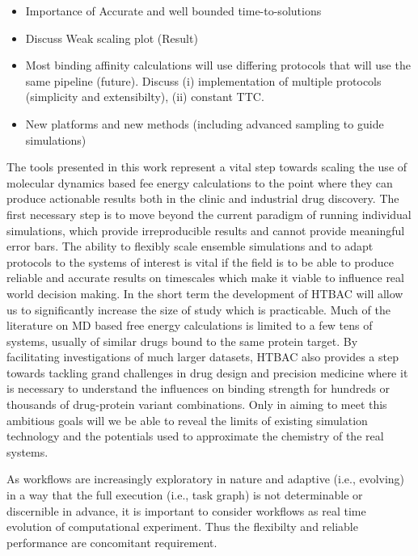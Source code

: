 
\begin{itemize}
	\item  Importance of Accurate and well bounded time-to-solutions 

	\item  Discuss Weak scaling plot (Result)

	\item  Most binding affinity calculations will use differing protocols that will use the same pipeline (future). Discuss (i) implementation of multiple protocols  (simplicity and extensibilty), (ii) constant TTC.

	\item  New platforms and new methods (including advanced sampling to guide simulations)

\end{itemize}


The tools presented in this work represent a vital step towards scaling the use of molecular
dynamics based fee energy calculations to the point where they can produce actionable 
results both in the clinic and industrial drug discovery.
The first necessary step is to move beyond the current paradigm of running individual simulations, 
which provide irreproducible results and cannot provide meaningful error bars.
The ability to flexibly scale ensemble simulations and to adapt protocols to the systems of 
interest is vital if the field is to be able to produce reliable and accurate results on 
timescales which make it viable to influence real world decision making.
In the short term the development of HTBAC will allow us to significantly increase the size of 
study which is practicable.
Much of the literature on MD based free energy calculations is limited to a few tens of systems, 
usually of similar drugs bound to the same protein target.
By facilitating investigations of much larger datasets, HTBAC also provides a step towards 
tackling grand challenges in drug design and precision medicine where it is necessary to understand 
the influences on binding strength for hundreds or thousands of drug-protein variant combinations.
Only in aiming to meet this ambitious goals will we be able to reveal the limits of existing simulation 
technology and the potentials used to approximate the chemistry of the real systems.

As workflows are increasingly exploratory in nature and adaptive (i.e.,
evolving) in a way that the full execution (i.e., task graph) is not
determinable or discernible in advance, it is important to consider 
workflows as real time evolution of computational experiment. Thus the
flexibilty and reliable performance are concomitant requirement.
